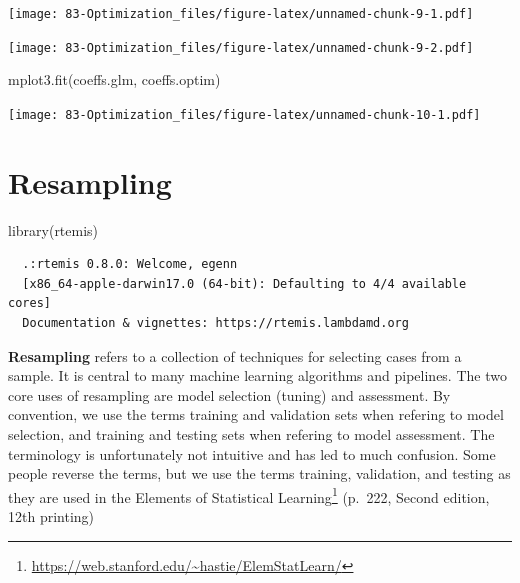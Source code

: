 \documentclass[
]{book}
\newenvironment{Shaded}{\begin{snugshade}}{\end{snugshade}}
\newcommand{\DecValTok}[1]{\textcolor[rgb]{0.00,0.00,0.81}{#1}}
\newcommand{\FunctionTok}[1]{\textcolor[rgb]{0.00,0.00,0.00}{#1}}
\newcommand{\NormalTok}[1]{#1}
\newcommand{\OtherTok}[1]{\textcolor[rgb]{0.56,0.35,0.01}{#1}}
\newcommand{\SpecialCharTok}[1]{\textcolor[rgb]{0.00,0.00,0.00}{#1}}
\DeclareRobustCommand{\href}[2]{#2\footnote{\url{#1}}}
\renewcommand{\href}[2]{#2\footnote{\url{#1}}}
\begin{document}
\texttt{[image: 83-Optimization\_files/figure-latex/unnamed-chunk-9-1.pdf]}

\begin{Shaded}
\end{Shaded}

\texttt{[image: 83-Optimization\_files/figure-latex/unnamed-chunk-9-2.pdf]}

\begin{Shaded}
\begin{Highlighting}[]
\FunctionTok{mplot3.fit}\NormalTok{(coeffs.glm, coeffs.optim)}
\end{Highlighting}
\end{Shaded}

\texttt{[image: 83-Optimization\_files/figure-latex/unnamed-chunk-10-1.pdf]}

\hypertarget{resampling}{%
\chapter{Resampling}\label{resampling}}

\begin{Shaded}
\begin{Highlighting}[]
\FunctionTok{library}\NormalTok{(rtemis)}
\end{Highlighting}
\end{Shaded}

\begin{verbatim}
  .:rtemis 0.8.0: Welcome, egenn
  [x86_64-apple-darwin17.0 (64-bit): Defaulting to 4/4 available cores]
  Documentation & vignettes: https://rtemis.lambdamd.org
\end{verbatim}

\textbf{Resampling} refers to a collection of techniques for selecting cases from a sample. It is central to many machine learning algorithms and pipelines. The two core uses of resampling are model selection (tuning) and assessment. By convention, we use the terms training and validation sets when refering to model selection, and training and testing sets when refering to model assessment. The terminology is unfortunately not intuitive and has led to much confusion. Some people reverse the terms, but we use the terms training, validation, and testing as they are used in the \href{https://web.stanford.edu/~hastie/ElemStatLearn/}{Elements of Statistical Learning} (p.~222, Second edition, 12th printing)
\end{document}
